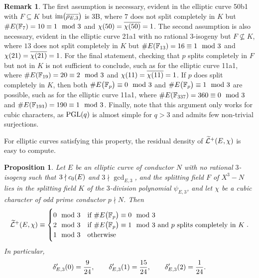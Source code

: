 \documentclass{article}
\theoremstyle{plain}
\newtheorem{proposition}[n]{Proposition}
\theoremstyle{definition}
\newtheorem{remark}[n]{Remark}
\newcommand{\FF}{\mathbb{F}}
\newcommand{\im}{\operatorname{im}}
\newcommand{\LLL}{\mathcal{L}}
\newcommand{\PGL}{\operatorname{PGL}}
\newcommand{\br}{\!\del}
\begin{document}
\begin{remark}
The first assumption is necessary, evident in the elliptic curve 50b1 with $ F \subseteq K $ but $ \im\br{\overline{\rho_{E, 3}}} $ is 3B, where $ 7 $ does not split completely in $ K $ but $ \#E\br{\FF_7} = 10 \equiv 1 \mod 3 $ and $ \chi\br{50} = \overline{\chi\br{50}} = 1 $. The second assumption is also necessary, evident in the elliptic curve 21a1 with no rational $ 3 $-isogeny but $ F \not\subseteq K $, where $ 13 $ does not split completely in $ K $ but $ \#E\br{\FF_{13}} = 16 \equiv 1 \mod 3 $ and $ \chi\br{21} = \overline{\chi\br{21}} = 1 $. For the final statement, checking that $ p $ splits completely in $ F $ but not in $ K $ is not sufficient to conclude, such as for the elliptic curve 11a1, where $ \#E\br{\FF_{19}} = 20 \equiv 2 \mod 3 $ and $ \chi\br{11} = \overline{\chi\br{11}} = 1 $. If $ p $ does split completely in $ K $, then both $ \#E\br{\FF_p} \equiv 0 \mod 3 $ and $ \#E\br{\FF_p} \equiv 1 \mod 3 $ are possible, such as for the elliptic curve 11a1, where $ \#E\br{\FF_{337}} = 360 \equiv 0 \mod 3 $ and $ \#E\br{\FF_{193}} = 190 \equiv 1 \mod 3 $. Finally, note that this argument only works for cubic characters, as $ \PGL\br{q} $ is almost simple for $ q > 3 $ and admits few non-trivial surjections.
\end{remark}

For elliptic curves satisfying this property, the residual density of $ \widetilde{\LLL}^+\br{E, \chi} $ is easy to compute.

\begin{proposition}
\label{prop:cubic}
Let $ E $ be an elliptic curve of conductor $ N $ with no rational $ 3 $-isogeny such that $ 3 \nmid c_0\br{E} $ and $ 3 \nmid \gcd_{E, 3} $, and the splitting field $ F $ of $ X^3 - N $ lies in the splitting field $ K $ of the $ 3 $-division polynomial $ \psi_{E, 3} $, and let $ \chi $ be a cubic character of odd prime conductor $ p \nmid N $. Then
$$ \widetilde{\LLL}^+\br{E, \chi} \equiv
\begin{cases}
0 \mod 3 & \text{if} \ \#E\br{\FF_p} \equiv 0 \mod 3 \\
2 \mod 3 & \text{if} \ \#E\br{\FF_p} \equiv 1 \mod 3 \ \text{and} \ p \ \text{splits completely in} \ K \\
1 \mod 3 & \text{otherwise}
\end{cases}.
$$
In particular,
$$ \delta_{E, 3}'\br{0} = \dfrac{9}{24}, \qquad \delta_{E, 3}'\br{1} = \dfrac{15}{24}, \qquad \delta_{E, 3}'\br{2} = \dfrac{1}{24}. $$
\end{proposition}
\end{document}
